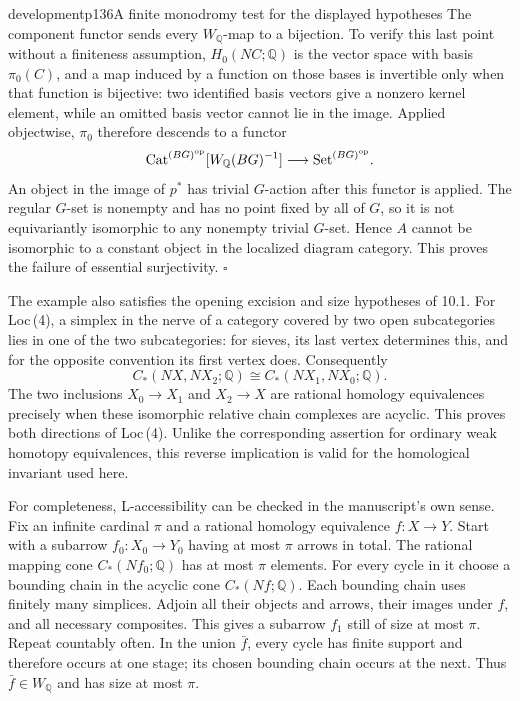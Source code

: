 \begin{dcomment}{development}{p136}{A finite monodromy test for the displayed hypotheses}
The component functor sends every $W_{\mathbb Q}$-map to a bijection. To verify this last point without a finiteness assumption, $H_0(NC;\mathbb Q)$ is the vector space with basis $\pi_0(C)$, and a map induced by a function on those bases is invertible only when that function is bijective: two identified basis vectors give a nonzero kernel element, while an omitted basis vector cannot lie in the image. Applied objectwise, $\pi_0$ therefore descends to a functor
\[
 \mathrm{Cat}^{(BG)^{\mathrm{op}}}[W_{\mathbb Q}(BG)^{-1}]
 \longrightarrow \mathrm{Set}^{(BG)^{\mathrm{op}}}.
\]
An object in the image of $p^*$ has trivial $G$-action after this functor is applied. The regular $G$-set is nonempty and has no point fixed by all of $G$, so it is not equivariantly isomorphic to any nonempty trivial $G$-set. Hence $A$ cannot be isomorphic to a constant object in the localized diagram category. This proves the failure of essential surjectivity. \hfill$\square$

The example also satisfies the opening excision and size hypotheses of 10.1. For Loc\,(4), a simplex in the nerve of a category covered by two open subcategories lies in one of the two subcategories: for sieves, its last vertex determines this, and for the opposite convention its first vertex does. Consequently
\[
 C_*(NX,NX_2;\mathbb Q)
 \cong C_*(NX_1,NX_0;\mathbb Q).
\]
The two inclusions $X_0\longrightarrow X_1$ and $X_2\longrightarrow X$ are rational homology equivalences precisely when these isomorphic relative chain complexes are acyclic. This proves both directions of Loc\,(4). Unlike the corresponding assertion for ordinary weak homotopy equivalences, this reverse implication is valid for the homological invariant used here.

For completeness, L-accessibility can be checked in the manuscript's own sense. Fix an infinite cardinal $\pi$ and a rational homology equivalence $f:X\longrightarrow Y$. Start with a subarrow $f_0:X_0\longrightarrow Y_0$ having at most $\pi$ arrows in total. The rational mapping cone $C_*(Nf_0;\mathbb Q)$ has at most $\pi$ elements. For every cycle in it choose a bounding chain in the acyclic cone $C_*(Nf;\mathbb Q)$. Each bounding chain uses finitely many simplices. Adjoin all their objects and arrows, their images under $f$, and all necessary composites. This gives a subarrow $f_1$ still of size at most $\pi$. Repeat countably often. In the union $\bar f$, every cycle has finite support and therefore occurs at one stage; its chosen bounding chain occurs at the next. Thus $\bar f\in W_{\mathbb Q}$ and has size at most $\pi$.


\end{dcomment}
